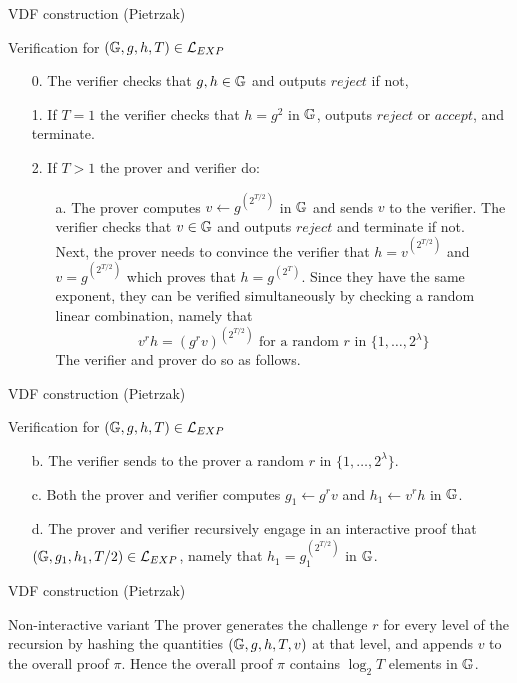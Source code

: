 \documentclass[UTF8]{beamer}
\begin{document}
	\begin{frame}{VDF construction (Pietrzak)}
		\begin{block}{Verification for $(\mathbb{G},g,h,T)\in\mathcal{L}_{EXP}$}
			\begin{enumerate}
				\item [0.] The verifier checks that $g,h\in\mathbb{G}$ and outputs $reject$ if not,
				\item [1.] If $T=1$ the verifier checks that $h=g^2$ in $\mathbb{G}$, outputs $reject$ or $accept$, and terminate.
				\item [2.] If $T>1$ the prover and verifier do:
				\begin{enumerate}
					\item [a.] The prover computes $v\gets g^{(2^{T/2})}$ in $\mathbb{G}$ and sends $v$ to the verifier. The verifier checks that $v\in\mathbb{G}$ and outputs $reject$ and terminate if not.\\
					Next, the prover needs to convince the verifier that $h=v^{(2^{T/2})}$ and $v=g^{(2^{T/2})}$ which proves that $h=g^{(2^{T})}$. Since they have the same exponent, they can be verified simultaneously by checking a random linear combination, namely that
					$$v^rh=(g^rv)^{(2^{T/2})}\text{ for a random }r \text{ in } \{1,\dots,2^\lambda\}$$ 
					The verifier and prover do so as follows.
				\end{enumerate}
			\end{enumerate}
		\end{block}
	\end{frame}
	\begin{frame}{VDF construction (Pietrzak)}
		\begin{block}{Verification for $(\mathbb{G},g,h,T)\in\mathcal{L}_{EXP}$}
			\begin{enumerate}
				\item [b.] The verifier sends to the prover a random $r$ in $\{1,\dots,2^\lambda\}$.
				\item [c.] Both the prover and verifier computes $g_1\gets g^rv$ and $h_1\gets v^rh$ in $\mathbb{G}$.
				\item [d.] The prover and verifier recursively engage in an interactive proof that $(\mathbb{G},g_1,h_1,T/2)\in\mathcal{L}_{EXP}$, namely that $h_1=g_1^{(2^{T/2})}$ in $\mathbb{G}$.
			\end{enumerate}
		\end{block}
	\end{frame}
	\begin{frame}{VDF construction (Pietrzak)}
		\begin{block}{Non-interactive variant}
			The prover generates the challenge $r$ for every level of the recursion by hashing the quantities $(\mathbb{G},g,h,T,v)$ at that level, and appends $v$ to the overall proof $\pi$. Hence the overall proof $\pi$ contains $\log_2T$ elements in $\mathbb{G}$.
		\end{block}
	\end{frame}
\end{document}
